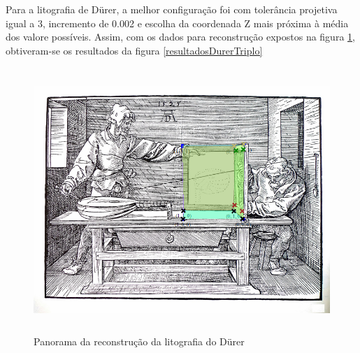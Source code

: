			Para a litografia de Dürer, a melhor configuração foi com tolerância projetiva igual a 3, incremento de 0.002 e escolha da coordenada Z mais próxima à média dos valore possíveis. Assim, com os dados para reconstrução expostos na figura \ref{printTesteDurer}, obtiveram-se os resultados da figura \ref{resultadosDurerTriplo}
			
			\begin{figure}[!htb]
				\centering
				\includegraphics[height=10cm]{imagens/printTesteDurer.png}
				\caption{Panorama da reconstrução da litografia do Dürer}
				\label{printTesteDurer}
			\end{figure}
			
